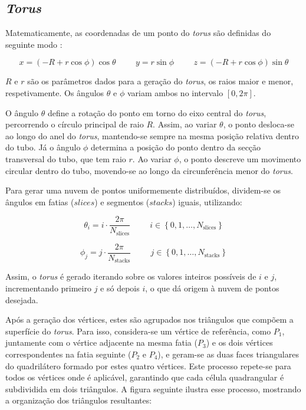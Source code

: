 \documentclass[12pt, a4paper]{article}
\begin{document}
\subsection{\emph{Torus}}

Matematicamente, as coordenadas de um ponto do \emph{torus} são definidas do seguinte modo
\cite{torus}:

$$
x = (-R + r \cos \phi) \cos \theta
\hspace{1cm}
y = r \sin \phi
\hspace{1cm}
z = (-R + r \cos \phi) \sin \theta
$$

$R$ e $r$ são os parâmetros dados para a geração do \emph{torus}, os raios maior e menor,
respetivamente. Os ângulos $\theta$ e $\phi$ variam ambos no intervalo $[0, 2\pi]$.

O ângulo $\theta$ define a rotação do ponto em torno do eixo central do \emph{torus}, percorrendo o
círculo principal de raio $R$. Assim, ao variar $\theta$, o ponto desloca-se ao longo do anel do
\emph{torus}, mantendo-se sempre na mesma posição relativa dentro do tubo. Já o ângulo $\phi$
determina a posição do ponto dentro da secção transversal do tubo, que tem raio $r$. Ao variar
$\phi$, o ponto descreve um movimento circular dentro do tubo, movendo-se ao longo da circunferência
menor do \emph{torus}.

Para gerar uma nuvem de pontos uniformemente distribuídos, dividem-se os ângulos em fatias
($slices$) e segmentos ($stacks$) iguais, utilizando:

$$
\theta_i = i \cdot \frac{2\pi}{N_\text{slices}}
\hspace{1cm}
i \in \left \lbrace 0, 1, \ldots, N_\text{slices} \right \rbrace
$$

$$
\phi_j = j \cdot \frac{2\pi}{N_\text{stacks}}
\hspace{1cm}
j \in \left \lbrace 0, 1, \ldots, N_\text{stacks} \right \rbrace
$$

Assim, o \emph{torus} é gerado iterando sobre os valores inteiros possíveis de $i$ e $j$,
incrementando primeiro $j$ e só depois $i$, o que dá origem à nuvem de pontos desejada.

Após a geração dos vértices, estes são agrupados nos triângulos que compõem a superfície do
\emph{torus}. Para isso, considera-se um vértice de referência, como $P_1$, juntamente com o vértice
adjacente na mesma fatia ($P_3$) e os dois vértices correspondentes na fatia seguinte
($P_2$ e $P_4$), e geram-se as duas faces triangulares do quadrilátero formado por estes quatro
vértices. Este processo repete-se para todos os vértices onde é aplicável, garantindo que cada
célula quadrangular é subdividida em dois triângulos. A figura seguinte ilustra esse processo,
mostrando a organização dos triângulos resultantes:
\end{document}
